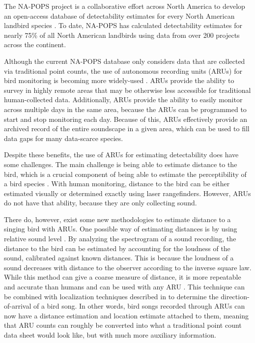 \documentclass[12pt]{article}
\begin{document}
\par The NA-POPS project is a collaborative effort across North America to develop an open-access database of detectability estimates for every North American landbird species \citep{edwards_point_2023}. To date, NA-POPS has calculated detectability estimates for nearly 75\% of all North American landbirds using data from over 200 projects across the continent. 

\par Although the current NA-POPS database only considers data that are collected via traditional point counts, the use of autonomous recording units (ARUs) for bird monitoring is becoming more widely-used \citep{perezgranados_estimating_2021, shonfield_autonomous_2017, sugai_terrestrial_2019}. ARUs provide the ability to survey in highly remote areas that may be otherwise less accessible for traditional human-collected data. Additionally, ARUs provide the ability to easily monitor across multiple days in the same area, because the ARUs can be programmed to start and stop monitoring each day. Because of this, ARUs effectively provide an archived record of the entire soundscape in a given area, which can be used to fill data gaps for many data-scarce species.

Despite these benefits, the use of ARUs for estimating detectability does have some challenges. The main challenge is being able to estimate distance to the bird, which is a crucial component of being able to estimate the perceptibility of a bird species \citep{buckland_distance_2015}. With human monitoring, distance to the bird can be either estimated visually or determined exactly using laser rangefinders. However, ARUs do not have that ability, because they are only collecting sound. 

There do, however, exist some new methodologies to estimate distance to a singing bird with ARUs. One possible way of estimating distances is by using relative sound level \citep{sebastian-gonzalez_density_2018, yip_sound_2017}. By analyzing the spectrogram of a sound recording, the distance to the bird can be estimated by accounting for the loudness of the sound, calibrated against known distances. This is because the loudness of a sound decreases with distance to the observer according to the inverse square law. While this method can give a coarse measure of distance, it is more repeatable and accurate than humans and can be used with any ARU \citep{yip_sound_2020}. This technique can be combined with localization techniques described in \cite{hedley_direction--arrival_2017} to determine the direction-of-arrival of a bird song. In other words, bird songs recorded through ARUs can now have a distance estimation and location estimate attached to them, meaning that ARU counts can roughly be converted into what a traditional point count data sheet would look like, but with much more auxiliary information. 
\end{document}
